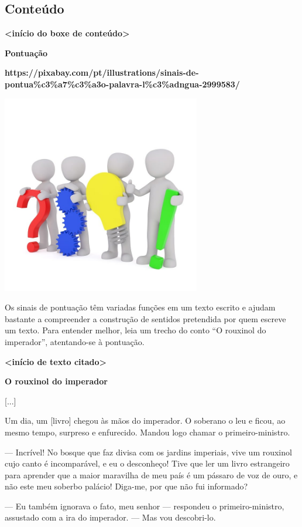 \subsection{Conteúdo}\label{conteuxfado-2}

\textbf{\textless{}início do boxe de conteúdo\textgreater{}}

\textbf{Pontuação}

\textbf{https://pixabay.com/pt/illustrations/sinais-de-pontua\%c3\%a7\%c3\%a3o-palavra-l\%c3\%adngua-2999583/}

\includegraphics[width=3.41667in,height=3.41667in]{media/image4.jpeg}

Os sinais de pontuação têm variadas funções em um texto escrito e ajudam
bastante a compreender a construção de sentidos pretendida por quem
escreve um texto. Para entender melhor, leia um trecho do conto ``O
rouxinol do imperador'', atentando-se à pontuação.

\textbf{\textless{}início de texto citado\textgreater{}}

\textbf{O rouxinol do imperador}

{[}...{]}

Um dia, um {[}livro{]} chegou às mãos do imperador. O soberano o leu e
ficou, ao mesmo tempo, surpreso e enfurecido. Mandou logo chamar o
primeiro-ministro.

--- Incrível! No bosque que faz divisa com os jardins imperiais, vive um
rouxinol cujo canto é incomparável, e eu o desconheço! Tive que ler um
livro estrangeiro para aprender que a maior maravilha de meu país é um
pássaro de voz de ouro, e não este meu soberbo palácio! Diga-me, por que
não fui informado?

--- Eu também ignorava o fato, meu senhor --- respondeu o
primeiro-ministro, assustado com a ira do imperador. --- Mas vou
descobri-lo.


